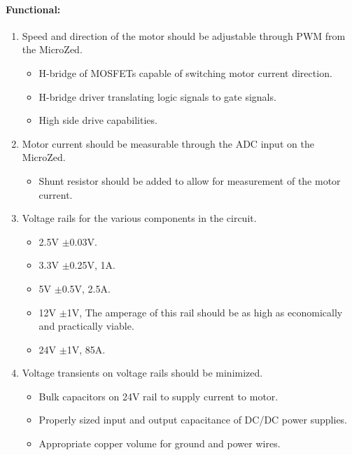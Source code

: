 \paragraph{Functional:}
\begin{enumerate}[resume]
	\item Speed and direction of the motor should be adjustable through PWM from the MicroZed.
	\label{enum:motor_speed_direction}
	\begin{itemize}
		\item H-bridge of MOSFETs capable of switching motor current direction.
		\item H-bridge driver translating logic signals to gate signals.
		\item High side drive capabilities.
	\end{itemize}

	\item Motor current should be measurable through the ADC input on the MicroZed.
	\label{enum:motor_current}
	\begin{itemize}
		\item Shunt resistor should be added to allow for measurement of the motor current.
	\end{itemize}

	\item Voltage rails for the various components in the circuit.
	\label{enum:voltage_rails}	
	\begin{itemize}
		\item 2.5V $\pm$0.03V.
		\item 3.3V $\pm$0.25V, 1A.
		\item 5V $\pm$0.5V, 2.5A.
		\item 12V $\pm$1V, The amperage of this rail should be as high as economically and practically viable.
		\item 24V $\pm$1V, 85A.
	\end{itemize}

	\item Voltage transients on voltage rails should be minimized.
	\label{enum:voltage_transients}	
	\begin{itemize}
		\item Bulk capacitors on 24V rail to supply current to motor.
		\item Properly sized input and output capacitance of DC/DC power supplies.
		\item Appropriate copper volume for ground and power wires.
	\end{itemize}


\end{enumerate}

